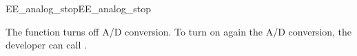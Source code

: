 \begin{function_nopb2}{EE\_analog\_stop}{EE_analog_stop}
  
  \begin{fundescription}
    The function turns off A/D conversion. To turn on again the A/D
    conversion, the developer can call .
  \end{fundescription}
  
  
  
\end{function_nopb2}
